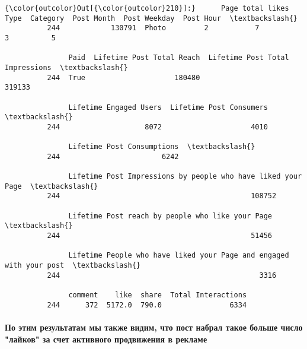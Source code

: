 \documentclass[11pt]{article}
\begin{document}
\begin{Verbatim}[commandchars=\\\{\}]
{\color{outcolor}Out[{\color{outcolor}210}]:}      Page total likes   Type  Category  Post Month  Post Weekday  Post Hour  \textbackslash{}
          244            130791  Photo         2           7             3          5   
          
               Paid  Lifetime Post Total Reach  Lifetime Post Total Impressions  \textbackslash{}
          244  True                     180480                           319133   
          
               Lifetime Engaged Users  Lifetime Post Consumers  \textbackslash{}
          244                    8072                     4010   
          
               Lifetime Post Consumptions  \textbackslash{}
          244                        6242   
          
               Lifetime Post Impressions by people who have liked your Page  \textbackslash{}
          244                                             108752              
          
               Lifetime Post reach by people who like your Page  \textbackslash{}
          244                                             51456   
          
               Lifetime People who have liked your Page and engaged with your post  \textbackslash{}
          244                                               3316                     
          
               comment    like  share  Total Interactions  
          244      372  5172.0  790.0                6334  
\end{Verbatim}
            
    \paragraph{По этим результатам мы также видим, что пост набрал такое
больше число "лайков" за счет активного продвижения в
рекламе}\label{ux43fux43e-ux44dux442ux438ux43c-ux440ux435ux437ux443ux43bux44cux442ux430ux442ux430ux43c-ux43cux44b-ux442ux430ux43aux436ux435-ux432ux438ux434ux438ux43c-ux447ux442ux43e-ux43fux43eux441ux442-ux43dux430ux431ux440ux430ux43b-ux442ux430ux43aux43eux435-ux431ux43eux43bux44cux448ux435-ux447ux438ux441ux43bux43e-ux43bux430ux439ux43aux43eux432-ux437ux430-ux441ux447ux435ux442-ux430ux43aux442ux438ux432ux43dux43eux433ux43e-ux43fux440ux43eux434ux432ux438ux436ux435ux43dux438ux44f-ux432-ux440ux435ux43aux43bux430ux43cux435}
\end{document}
